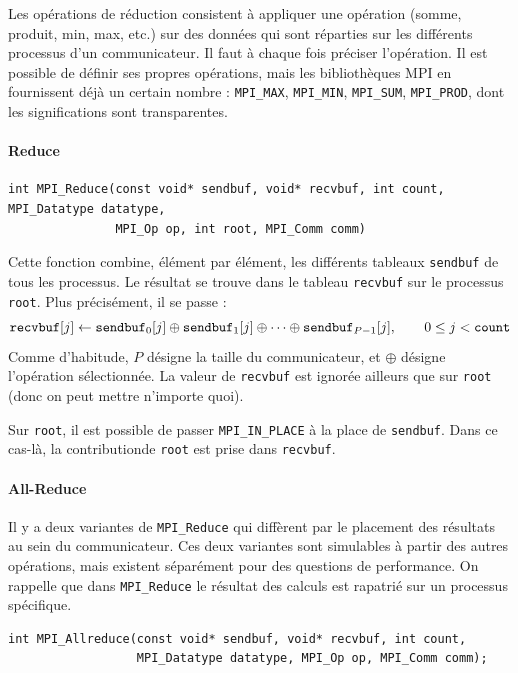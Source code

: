 Les opérations de réduction consistent à appliquer une opération
(somme, produit, min, max, etc.) sur des données qui sont réparties
sur les différents processus d'un communicateur. Il faut à chaque fois
préciser l'opération. Il est possible de définir ses propres
opérations, mais les bibliothèques MPI en fournissent déjà un certain
nombre : \verb|MPI_MAX|, \verb|MPI_MIN|, \verb|MPI_SUM|,
\verb|MPI_PROD|, dont les significations sont transparentes.

\paragraph{Reduce}
\begin{verbatim}
int MPI_Reduce(const void* sendbuf, void* recvbuf, int count, MPI_Datatype datatype,
               MPI_Op op, int root, MPI_Comm comm)
\end{verbatim}

Cette fonction combine, élément par élément, les différents tableaux
\verb|sendbuf| de tous les processus. Le résultat se trouve dans le
tableau \verb|recvbuf| sur le processus \verb|root|. Plus précisément,
il se passe :
\[
\verb|recvbuf|[j] \gets \verb|sendbuf|_0[j] \oplus \verb|sendbuf|_1[j]
\oplus \dots \oplus \verb|sendbuf|_{P-1}[j], \qquad 0 \leq j < \verb|count|
\]
Comme d'habitude, $P$ désigne la taille du communicateur, et $\oplus$
désigne l'opération sélectionnée. La valeur de \verb|recvbuf| est
ignorée ailleurs que sur \verb|root| (donc on peut mettre n'importe
quoi).

Sur \verb|root|, il est possible de passer \verb|MPI_IN_PLACE| à la
place de \verb|sendbuf|. Dans ce cas-là, la \og contribution\fg de
\verb|root| est prise dans \verb|recvbuf|.

\paragraph{All-Reduce}

Il y a deux variantes de \verb|MPI_Reduce| qui diffèrent par le
placement des résultats au sein du communicateur. Ces deux variantes
sont simulables à partir des autres opérations, mais existent
séparément pour des questions de performance. On rappelle que dans
\verb|MPI_Reduce| le résultat des calculs est rapatrié sur un
processus spécifique.

\begin{verbatim}
int MPI_Allreduce(const void* sendbuf, void* recvbuf, int count,
                  MPI_Datatype datatype, MPI_Op op, MPI_Comm comm);
\end{verbatim}

